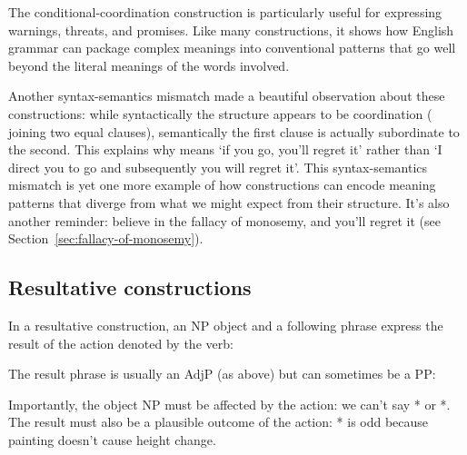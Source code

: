 The conditional-coordination construction is particularly useful for expressing warnings, threats, and promises. Like many constructions, it shows how English grammar can package complex meanings into conventional patterns that go well beyond the literal meanings of the words involved.


\begin{tblsframed}{Another syntax-semantics mismatch}
\citet{culicover1997semantic} made a beautiful observation about these constructions: while syntactically the structure appears to be coordination ( joining two equal clauses), semantically the first clause is actually subordinate to the second. This explains why  means `if you go, you'll regret it' rather than `I direct you to go and subsequently you will regret it'. This syntax-semantics mismatch is yet one more example of how constructions can encode meaning patterns that diverge from what we might expect from their structure. It's also another reminder: believe in the fallacy of monosemy, and you'll regret it (see Section~\ref{sec:fallacy-of-monosemy}).
\end{tblsframed}

\subsection{Resultative constructions}

In a resultative construction, an NP object and a following phrase express the result of the action denoted by the verb:

\ea\label{ex:resultative}
   \z
\z
The result phrase is usually an AdjP (as above) but can sometimes be a PP:

\ea\label{ex:resultative-pp}
   \z
\z
Importantly, the object NP must be affected by the action: we can't say * or *. The result must also be a plausible outcome of the action: * is odd because painting doesn't cause height change.


